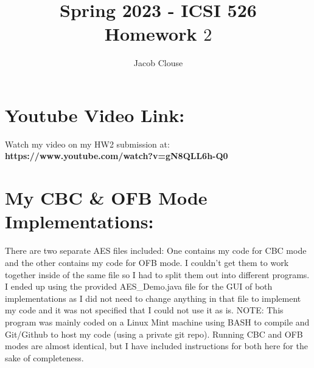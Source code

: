 \documentclass[10pt]{article}
\author{Jacob Clouse}
\title{Spring 2023 - ICSI 526\\Homework $2$}
\begin{document}
\maketitle
\tableofcontents
\vspace{0.2in}
\section{Youtube Video Link:}
\noindent Watch my video on my HW2 submission at:  \textbf{https://www.youtube.com/watch?v=gN8QLL6h-Q0}
\vspace{0.2in}
\section{My CBC \& OFB Mode Implementations:}
\noindent There are two separate AES files included: One contains my code for CBC mode and the other contains my code for OFB mode. I couldn't get them to work together inside of the same file so I had to split them out into different programs. I ended up using the provided AES\_Demo.java file for the GUI of both implementations as I did not need to change anything in that file to implement my code and it was not specified that I could not use it as is. NOTE: This program was mainly coded on a Linux Mint machine using BASH to compile and Git/Github to host my code (using a private git repo). Running CBC and OFB modes are almost identical, but I have included instructions for both here for the sake of completeness. 
\vspace{0.2in}
\\
\end{document}
